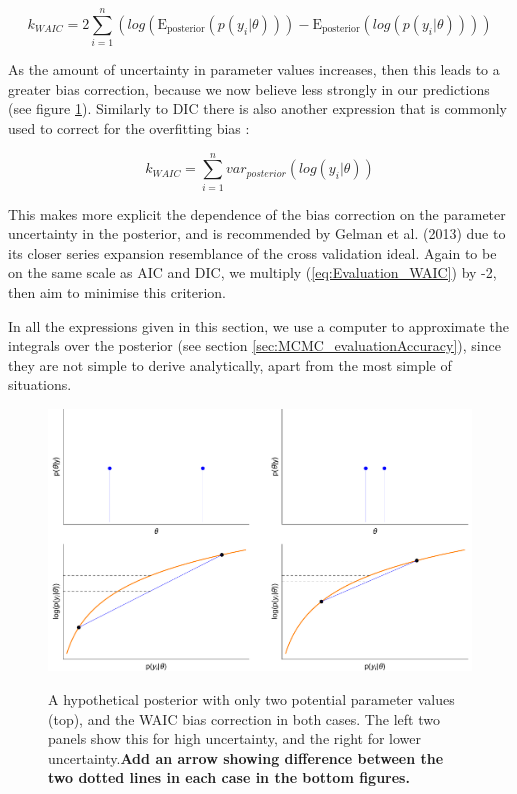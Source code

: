 \documentclass[11pt,fullpage]{book}
\begin{document}
\begin{equation}
k_{WAIC} = 2\sum\limits_{i=1}^{n} \left(log(\mathrm{E_{posterior}}(p(y_i|\theta))) - \mathrm{E_{posterior}}(log(p(y_i|\theta)))\right)
\end{equation}

As the amount of uncertainty in parameter values increases, then this leads to a greater bias correction, because we now believe less strongly in our predictions (see figure \ref{fig:Evaluation_WAICBiasCorrection}). Similarly to DIC there is also another expression that is commonly used to correct for the overfitting bias \cite{gelman2013bayesian}:

\begin{equation}
k_{WAIC} = \sum\limits_{i=1}^{n} var_{posterior}(log(y_i|\theta))
\end{equation}

This makes more explicit the dependence of the bias correction on the parameter uncertainty in the posterior, and is recommended by Gelman et al. (2013) due to its closer series expansion resemblance of the cross validation ideal. Again to be on the same scale as AIC and DIC, we multiply (\ref{eq:Evaluation_WAIC}) by -2, then aim to minimise this criterion.

In all the expressions given in this section, we use a computer to approximate the integrals over the posterior (see section \ref{sec:MCMC_evaluationAccuracy}), since they are not simple to derive analytically, apart from the most simple of situations.

\begin{figure}
\centering
\scalebox{0.4} 
{\includegraphics{Evaluation_WAICBiasCorrection.pdf}}
\caption{A hypothetical posterior with only two potential parameter values (top), and the WAIC bias correction in both cases. The left two panels show this for high uncertainty, and the right for lower uncertainty.\textbf{Add an arrow showing difference between the two dotted lines in each case in the bottom figures.}}\label{fig:Evaluation_WAICBiasCorrection}
\end{figure}
\end{document}
